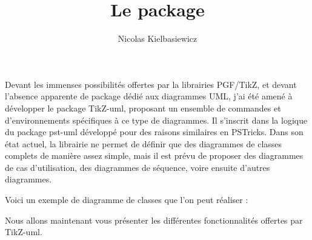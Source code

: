 \documentclass[a4paper,11pt]{article}
\title{Le package \tuml} %
\author{Nicolas {\sc Kielbasiewicz}} %
\newcommand{\tuml}{{\sc TikZ-uml}}
\begin{document}
\maketitle

Devant les immenses possibilités offertes par la librairies PGF/TikZ, et devant l'absence apparente de package dédié aux diagrammes UML, j'ai été amené à développer le package \tuml, proposant un ensemble de commandes et d'environnements spécifiques à ce type de diagrammes. Il s'inscrit dans la logique du package pst-uml développé pour des raisons similaires en PSTricks. Dans son état actuel, la librairie ne permet de définir que des diagrammes de classes complets de manière assez simple, mais il est prévu de proposer des diagrammes de cas d'utilisation, des diagrammes de séquence, voire ensuite d'autres diagrammes.

Voici un exemple de diagramme de classes que l'on peut réaliser :

\begin{center}
\end{center}

Nous allons maintenant vous présenter les différentes fonctionnalités offertes par \tuml.
\end{document}
